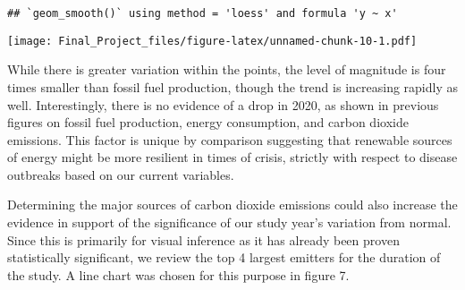 \documentclass[
]{article}
\begin{document}
\begin{verbatim}
## `geom_smooth()` using method = 'loess' and formula 'y ~ x'
\end{verbatim}

\texttt{[image: Final\_Project\_files/figure-latex/unnamed-chunk-10-1.pdf]}

While there is greater variation within the points, the level of
magnitude is four times smaller than fossil fuel production, though the
trend is increasing rapidly as well. Interestingly, there is no evidence
of a drop in 2020, as shown in previous figures on fossil fuel
production, energy consumption, and carbon dioxide emissions. This
factor is unique by comparison suggesting that renewable sources of
energy might be more resilient in times of crisis, strictly with respect
to disease outbreaks based on our current variables.

Determining the major sources of carbon dioxide emissions could also
increase the evidence in support of the significance of our study year's
variation from normal. Since this is primarily for visual inference as
it has already been proven statistically significant, we review the top
4 largest emitters for the duration of the study. A line chart was
chosen for this purpose in figure 7.
\end{document}
